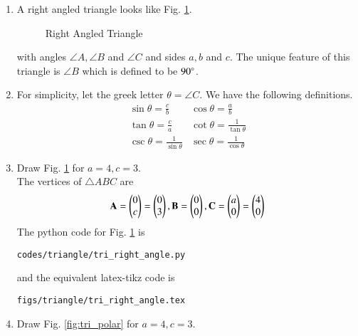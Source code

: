 \renewcommand{\theequation}{\theenumi}
\begin{enumerate}[label=\arabic*.,ref=\thesubsection.\theenumi]
\item


A right angled triangle looks like Fig. \ref{fig:tri_right_angle}.
\begin{figure}[!ht]
\centering
\resizebox{\columnwidth}{!}{}
\caption{Right Angled Triangle}
\label{fig:tri_right_angle}	
\end{figure}
with angles $\angle A,\angle B$ and $\angle C$ and sides $a, b$ and $c$.  The unique feature of this triangle is $\angle B$ which is defined to be $90\degree$.
\item
	For simplicity, let the greek letter $\theta = \angle C$.  We have the following definitions.
\begin{equation}
\label{eq:tri_trig_defs}
\begin{matrix}
	\sin \theta = \frac{c}{b} & 	\cos \theta = \frac{a}{b} \\
	\tan \theta = \frac{c}{a} & \cot \theta = \frac{1}{\tan \theta} \\
	\csc \theta = \frac{1}{\sin \theta} & \sec \theta = \frac{1}{\cos \theta}
	\end{matrix}
\end{equation}
%
\item Draw Fig. \ref{fig:tri_right_angle} for $a = 4, c =3$.
\label{const:tri_right_angle}
%
\\
\solution The vertices of $\triangle ABC$ are 
\begin{align}
\mathbf{A} = \begin{pmatrix}0\\c\end{pmatrix} = \begin{pmatrix}0\\3\end{pmatrix}, \mathbf{B} = \begin{pmatrix}0\\0\end{pmatrix}, \mathbf{C} = \begin{pmatrix}a\\0\end{pmatrix}=\begin{pmatrix}4\\0\end{pmatrix}
\end{align}
%
The python code for  Fig. \ref{fig:tri_right_angle} is
\begin{lstlisting}
codes/triangle/tri_right_angle.py
\end{lstlisting}
%
and the equivalent latex-tikz code is
%
\begin{lstlisting}
figs/triangle/tri_right_angle.tex
\end{lstlisting}
%
\item Draw Fig. \ref{fig:tri_polar} for $a = 4, c =3$.
\label{const:tri_polar}
%
\\

\end{enumerate}
